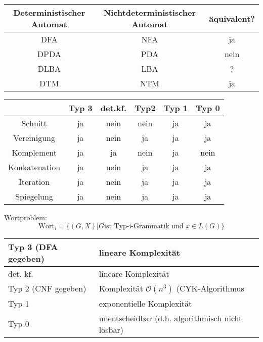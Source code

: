 \documentclass[9pt]{article}
\begin{document}
\begin{table}
    \begin{tabular}{|c|c|c|}
    	\hline
    	Deterministischer Automat & Nichtdeterministischer Automat & äquivalent?\\
    	\hline\hline
    	DFA & NFA & ja\\
    	\hline
    	DPDA & PDA & nein\\
    	\hline
    	DLBA & LBA & ?\\
    	\hline
    	DTM & NTM & ja\\
    	\hline
    \end{tabular}
\end{table}
\begin{table}
	\begin{tabular}{|c|c|c|c|c|c|}
		&Typ 3& det.kf.&Typ2 & Typ 1 & Typ 0\\
		\hline\hline
		Schnitt & ja & nein & nein & ja & ja\\
		\hline
		Vereinigung & ja & nein & ja & ja & ja\\
		\hline
		Komplement & ja & ja & nein & ja & nein\\
		\hline
		Konkatenation & ja & nein & ja & ja & ja\\
		\hline
		Iteration & ja & nein & ja & ja & ja\\
		\hline
		Spiegelung & ja & nein & ja & ja & ja\\
		\hline
	\end{tabular}
\end{table}
Wortproblem:
$$\text{Wort}_i = \{(G, X)|G \text{ist Typ-i-Grammatik und }x \in L(G)\}$$
\begin{table}
	\begin{tabular}{|l|l|}
		Typ 3 (DFA gegeben) & lineare Komplexität\\
		\hline
		det. kf. & lineare Komplexität\\
		\hline
		Typ 2 (CNF gegeben) & Komplexität $\mathcal{O}(n^3)$ (CYK-Algorithmus\\
		\hline
		Typ 1 & exponentielle Komplexität\\
		\hline
		Typ 0 & unentscheidbar (d.h. algorithmisch nicht lösbar)\\
		\hline
	\end{tabular}
\end{table}
\end{document}
